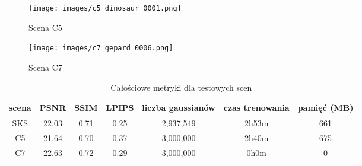 \begin{figure}[!h]
    \centering
    \texttt{[image: images/c5\_dinosaur\_0001.png]}
    \caption{Scena C5}
    \label{fig:c5_gs}
\end{figure}

\begin{figure}[!h]
    \centering
    \texttt{[image: images/c7\_gepard\_0006.png]}
    \caption{Scena C7}
    \label{fig:c7_gs}
\end{figure}

\begin{table}[!h]
    \centering
    \begin{tabular}{|c|c|c|c|c|c|c|}
    \hline
    scena & PSNR & SSIM & LPIPS & liczba gaussianów & czas trenowania & pamięć (MB) \\
    \hline 
    SKS & 22.03 & 0.71 & 0.25 & 2,937,549 & 2h53m & 661 \\
    \hline 
    C5 & 21.64 & 0.70 & 0.37 & 3,000,000 & 2h40m & 675 \\
    \hline 
    C7 & 22.63 & 0.72 & 0.29 & 3,000,000 & 0h0m & 0\\
    \hline
    \end{tabular}
\caption{Całościowe metryki dla testowych scen}
\label{table:tab_conf_sks}
\end{table}